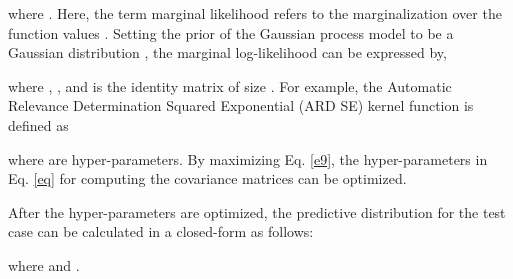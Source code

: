\documentclass[runningheads]{llncs}
\begin{document}
where .
Here, the term marginal likelihood refers to the marginalization over the function values .
Setting the prior of the Gaussian process model  to be a Gaussian distribution ,
the marginal log-likelihood  can be expressed by,

where , , and  is the identity matrix of size . For example, the Automatic Relevance Determination Squared Exponential (ARD SE) kernel function is defined as

where  are hyper-parameters. By maximizing Eq. \ref{e9}, the hyper-parameters in Eq. \ref{eq} for computing the covariance matrices can be optimized.

After the hyper-parameters are optimized, the predictive distribution for the test case  can be calculated in a closed-form as follows:

where  and .
\end{document}
